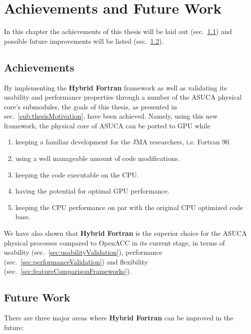 \chapter{Achievements and Future Work} \label{cha:achievements}

In this chapter the achievements of this thesis will be laid out (sec.~\ref{sec:achievements}) and possible future improvements will be listed (sec.~\ref{sec:futureWork}).

\section{Achievements} \label{sec:achievements}

By implementing the \textbf{Hybrid Fortran} framework as well as validating its usability and performance properties through a number of the ASUCA physical core's submodules, the goals of this thesis, as presented in sec.~\ref{sub:thesisMotivation}, have been achieved. Namely, using this new framework, the physical core of ASUCA can be ported to GPU while

\begin{enumerate}
 \item keeping a familiar development for the JMA researchers, i.e. Fortran 90. 
 \item using a well manageable amount of code modifications.
 \item keeping the code executable on the CPU.
 \item having the potential for optimal GPU performance.
 \item keeping the CPU performance on par with the original CPU optimized code base.
\end{enumerate}

We have also shown that \textbf{Hybrid Fortran} is the superior choice for the ASUCA physical processes compared to OpenACC in its current stage, in terms of usability (sec.~\ref{sec:usabilityValidation}), performance (sec.~\ref{sec:performanceValidation}) and flexibility (sec.~\ref{sec:featureComparisonFrameworks}).

\clearpage
\section{Future Work} \label{sec:futureWork}

There are three major areas where \textbf{Hybrid Fortran} can be improved in the future: 

